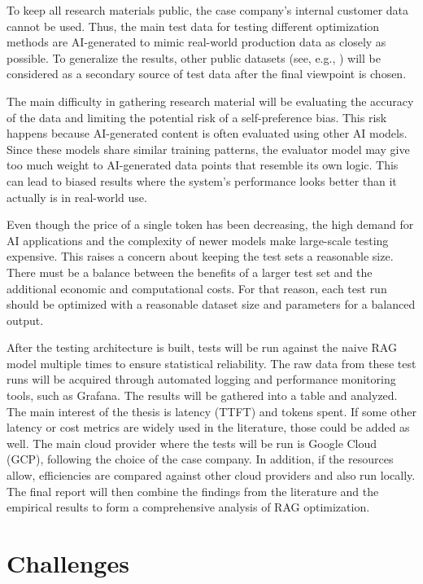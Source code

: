 \documentclass[12pt,a4paper,english,oneside]{article}
\begin{document}
To keep all research materials public, the case company's internal customer data cannot be used. Thus, the main test data for testing different optimization methods are AI-generated to mimic real-world production data as closely as possible. To generalize the results, other public datasets (see, e.g., \cite{gan2025rag}) will be considered as a secondary source of test data after the final viewpoint is chosen.

The main difficulty in gathering research material will be evaluating the accuracy of the data and limiting the potential risk of a self-preference bias. This risk happens because AI-generated content is often evaluated using other AI models. Since these models share similar training patterns, the evaluator model may give too much weight to AI-generated data points that resemble its own logic. This can lead to biased results where the system's performance looks better than it actually is in real-world use.

Even though the price of a single token has been decreasing, the high demand for AI applications and the complexity of newer models make large-scale testing expensive. This raises a concern about keeping the test sets a reasonable size. There must be a balance between the benefits of a larger test set and the additional economic and computational costs. For that reason, each test run should be optimized with a reasonable dataset size and parameters for a balanced output.

After the testing architecture is built, tests will be run against the naive RAG model multiple times to ensure statistical reliability. The raw data from these test runs will be acquired through automated logging and performance monitoring tools, such as Grafana. The results will be gathered into a table and analyzed. The main interest of the thesis is latency (TTFT) and tokens spent. If some other latency or cost metrics are widely used in the literature, those could be added as well. The main cloud provider where the tests will be run is Google Cloud (GCP), following the choice of the case company. In addition, if the resources allow, efficiencies are compared against other cloud providers and also run locally. The final report will then combine the findings from the literature and the empirical results to form a comprehensive analysis of RAG optimization.

\section{Challenges}
\end{document}
